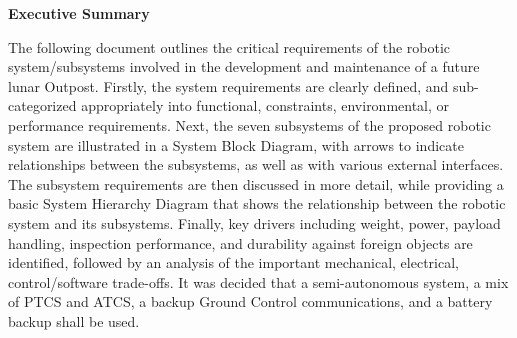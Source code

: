 
\vspace*{\fill}
\begin{center}
\large
\textbf{Executive Summary}
\end{center}

\normalsize
The following document outlines the critical requirements of the robotic system/subsystems involved in the development and maintenance of a future lunar Outpost. Firstly, the system requirements are clearly defined, and sub-categorized appropriately into functional, constraints, environmental, or performance requirements. Next, the seven subsystems of the proposed robotic system are illustrated in a System Block Diagram, with arrows to indicate relationships between the subsystems, as well as with various external interfaces. The subsystem requirements are then discussed in more detail, while providing a basic System Hierarchy Diagram that shows the relationship between the robotic system and its subsystems. Finally, key drivers including weight, power, payload handling, inspection performance, and durability against foreign objects are identified, followed by an analysis of the important mechanical, electrical, control/software trade-offs. It was decided that a semi-autonomous system, a mix of PTCS and ATCS, a backup Ground Control communications, and a battery backup shall be used. 

\vspace*{\fill}


